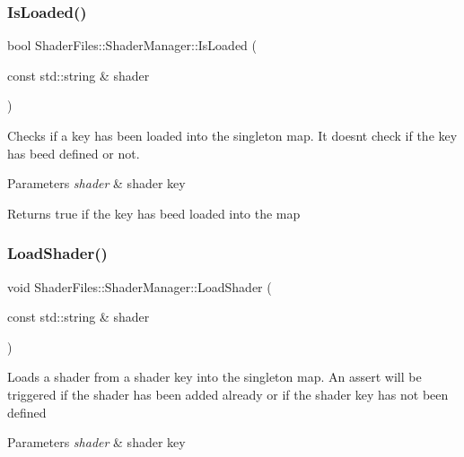 \subsubsection{\texorpdfstring{IsLoaded()}{IsLoaded()}}
{\footnotesize\ttfamily bool Shader\+Files\+::\+Shader\+Manager\+::\+Is\+Loaded (\begin{DoxyParamCaption}\item[{const std\+::string \&}]{shader }\end{DoxyParamCaption})}

Checks if a key has been loaded into the singleton map. It doesn\textquotesingle{}t check if the key has beed defined or not. 
\begin{DoxyParams}{Parameters}
{\em shader} & shader key \\
\hline
\end{DoxyParams}
\begin{DoxyReturn}{Returns}
true if the key has beed loaded into the map 
\end{DoxyReturn}
\mbox{\label{class_shader_files_1_1_shader_manager_abcee9b4822ed9c362c0266d61ed99be6}} 
\subsubsection{\texorpdfstring{LoadShader()}{LoadShader()}}
{\footnotesize\ttfamily void Shader\+Files\+::\+Shader\+Manager\+::\+Load\+Shader (\begin{DoxyParamCaption}\item[{const std\+::string \&}]{shader }\end{DoxyParamCaption})}

Loads a shader from a shader key into the singleton map. An assert will be triggered if the shader has been added already or if the shader key has not been defined 
\begin{DoxyParams}{Parameters}
{\em shader} & shader key \\
\hline
\end{DoxyParams}
\mbox{\label{class_shader_files_1_1_shader_manager_a58fa6395429ed76613b1c70dec844c09}} 
